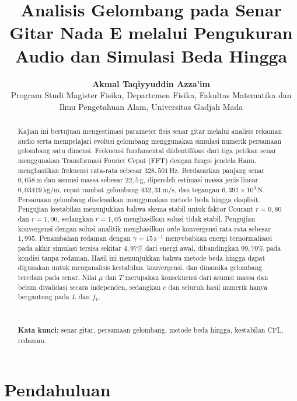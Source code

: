 \documentclass[aps,prl,twocolumn,superscriptaddress]{revtex4-2}
\begin{document}
\title{Analisis Gelombang pada Senar Gitar Nada E melalui Pengukuran Audio dan Simulasi Beda Hingga}
\author{\textbf{Akmal Taqiyyuddin Azza'im}\\
    \normalsize Program Studi Magister Fisika, Departemen Fisika, Fakultas Matematika dan Ilmu Pengetahuan Alam, Universitas Gadjah Mada\\}

\begin{abstract}
Kajian ini bertujuan mengestimasi parameter fisis senar gitar
melalui analisis rekaman audio serta mempelajari evolusi
gelombang menggunakan simulasi numerik persamaan gelombang
satu dimensi. Frekuensi fundamental diidentifikasi dari tiga
petikan senar menggunakan Transformasi Fourier Cepat (FFT)
dengan fungsi jendela Hann, menghasilkan frekuensi rata-rata
sebesar $328{,}501\,\mathrm{Hz}$. Berdasarkan panjang senar
$0{,}658\,\mathrm{m}$ dan asumsi massa sebesar $22{,}5\,\mathrm{g}$,
diperoleh estimasi massa jenis linear
$0{,}03419\,\mathrm{kg/m}$, cepat rambat gelombang
$432{,}31\,\mathrm{m/s}$, dan tegangan
$6{,}391\times10^3\,\mathrm{N}$. Persamaan gelombang
diselesaikan menggunakan metode beda hingga eksplisit.
Pengujian kestabilan menunjukkan bahwa skema stabil untuk
faktor Courant $r=0{,}80$ dan $r=1{,}00$, sedangkan
$r=1{,}05$ menghasilkan solusi tidak stabil. Pengujian
konvergensi dengan solusi analitik menghasilkan orde
konvergensi rata-rata sebesar $1{,}995$. Penambahan redaman
dengan $\gamma=15\,\mathrm{s}^{-1}$ menyebabkan energi
ternormalisasi pada akhir simulasi tersisa sekitar $4{,}97\%$
dari energi awal, dibandingkan $99{,}70\%$ pada kondisi
tanpa redaman. Hasil ini menunjukkan bahwa metode beda
hingga dapat digunakan untuk menganalisis kestabilan,
konvergensi, dan dinamika gelombang teredam pada senar.
Nilai $\mu$ dan $T$ merupakan konsekuensi dari asumsi massa
dan belum divalidasi secara independen, sedangkan $c$ dan
seluruh hasil numerik hanya bergantung pada $L$ dan $f_1$.

$\quad$

\noindent\textbf{Kata kunci:} senar gitar, persamaan gelombang, metode beda hingga, kestabilan CFL, redaman.
\end{abstract}

\maketitle

\section{Pendahuluan}
\end{document}
